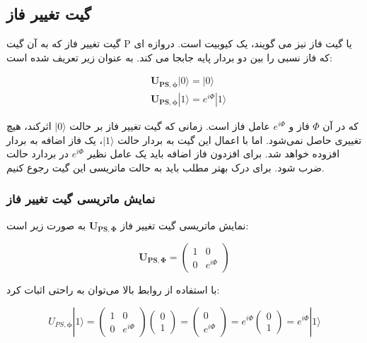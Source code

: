\documentclass{book}
\begin{document}
\subsection*{گیت تغییر فاز}
گیت تغییر فاز که به آن گیت P یا گیت فاز نیز می گویند، یک کیوبیت است.
دروازه ای که فاز نسبی را بین دو بردار پایه جابجا می کند. به عنوان زیر تعریف شده است:
\begin{center}
	\begin{equation}
		\begin{aligned}
		& \boldsymbol{U}_{\boldsymbol{PS}, \boldsymbol{\phi}}|0\rangle=|0\rangle \\
		& \boldsymbol{U}_{\boldsymbol{PS},  \boldsymbol{\phi}}|1\rangle=e^{i \Phi}|1\rangle
	\end{aligned}
\end{equation}
\end{center}


که در آن $\Phi$ فاز و $e^{i\Phi}$ عامل فاز است. 
زمانی که گیت تغییر فاز بر حالت $\vert 0 \rangle$  اثرکند، هیچ تغییری حاصل نمی‌شود. اما با اعمال این گیت به بردار حالت $\vert 1 \rangle$، یک فاز اضافه به بردار افزوده خواهد شد. برای افزدون فاز اضافه  باید یک عامل نظیر  $e^{i\Phi}$ در بردارد حالت ضرب شود. برای درک بهتر مطلب باید به حالت ماتریسی این گیت رجوع کنیم.





\subsubsection{نمایش ماتریسی گیت تغییر فاز}

نمایش ماتریسی گیت تغییر فاز $\boldsymbol{U}_{\boldsymbol{P} \boldsymbol{S}, \boldsymbol{\Phi}}$ به صورت زیر است:

\begin{center}
	$$\boldsymbol{U}_{\boldsymbol{P} \boldsymbol{S}, \boldsymbol{\Phi}}=\left(\begin{array}{cc}
		1 & 0 \\
		0 & e^{i \Phi}
	\end{array}\right)$$
\end{center}
با استفاده از روابط بالا می‌توان  به راحتی اثبات کرد: 
\begin{center}
	$$U_{P S, \boldsymbol{\phi}}|1\rangle=\left(\begin{array}{cc}
		1 & 0 \\
		0 & e^{i \Phi}
	\end{array}\right)\left(\begin{array}{l}
		0 \\
		1
	\end{array}\right)=\left(\begin{array}{c}
		0 \\
		e^{i \Phi}
	\end{array}\right)=e^{i \Phi}\left(\begin{array}{l}
		0 \\
		1
	\end{array}\right)=e^{i \Phi}|1\rangle$$
\end{center}
\end{document}
